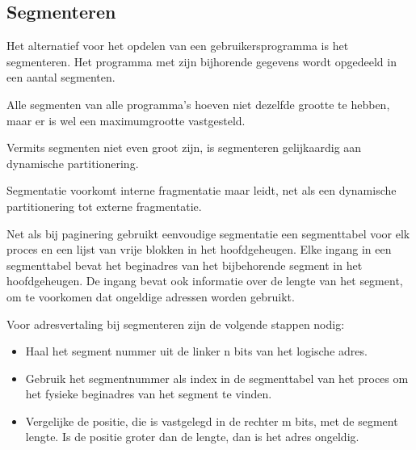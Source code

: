 \subsection{Segmenteren}

Het alternatief voor het opdelen van een gebruikersprogramma is het segmenteren. Het programma met zijn bijhorende gegevens wordt opgedeeld in een aantal segmenten.

Alle segmenten van alle programma’s hoeven niet dezelfde grootte te hebben, maar er is wel een maximumgrootte vastgesteld.

Vermits segmenten niet even groot zijn, is segmenteren gelijkaardig aan dynamische partitionering.

Segmentatie voorkomt interne fragmentatie maar leidt, net als een dynamische partitionering tot externe fragmentatie.

Net als bij paginering gebruikt eenvoudige segmentatie een segmenttabel voor elk proces en een lijst van vrije blokken in het hoofdgeheugen. Elke ingang in een segmenttabel bevat het beginadres van het bijbehorende segment in het hoofdgeheugen. De ingang bevat ook informatie over de lengte van het segment, om te voorkomen dat ongeldige adressen worden gebruikt.

Voor adresvertaling bij segmenteren zijn de volgende stappen nodig:

\begin{itemize}
\item Haal het segment nummer uit de linker n bits van het logische adres.
\item Gebruik het segmentnummer als index in de segmenttabel van het proces om het fysieke beginadres van het segment te vinden.
\item Vergelijke de positie, die is vastgelegd in de rechter m bits, met de segment lengte. Is de positie groter dan de lengte, dan is het adres ongeldig.
\end{itemize}
